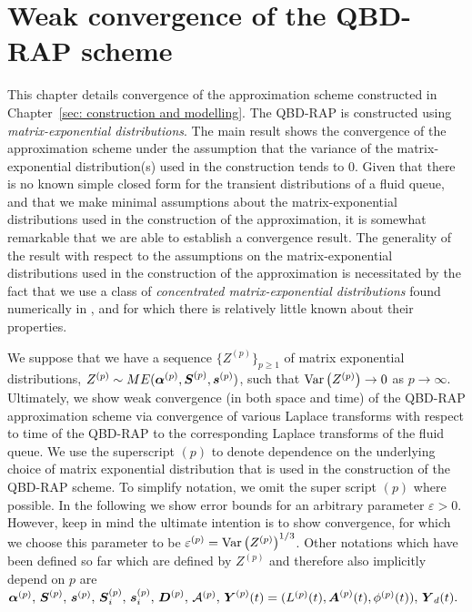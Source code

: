 \chapter{Weak convergence of the QBD-RAP scheme\label{sec: conv}}
This chapter details convergence of the approximation scheme constructed in Chapter~\ref{sec: construction and modelling}. The QBD-RAP is constructed using \emph{matrix-exponential distributions}. The main result shows the convergence of the approximation scheme under the assumption that the variance of the matrix-exponential distribution(s) used in the construction tends to 0. Given that there is no known simple closed form for the transient distributions of a fluid queue, and that we make minimal assumptions about the matrix-exponential distributions used in the construction of the approximation, it is somewhat remarkable that we are able to establish a convergence result. The generality of the result with respect to the assumptions on the matrix-exponential distributions used in the construction of the approximation is necessitated by the fact that we use a class of \emph{concentrated matrix-exponential distributions} found numerically in \citep{hht2020}, and for which there is relatively little known about their properties.

We suppose that we have a sequence \(\{Z^{(p)}\}_{p\geq 1}\) of matrix exponential distributions, \(Z^{(p)}\sim ME(\boldsymbol\alpha^{(p)},\boldsymbol S^{(p)}, \boldsymbol s^{(p)})\), such that \(\mathrm{Var}\left(Z^{(p)}\right)\to 0 \) as \(p\to \infty\). Ultimately, we show weak convergence (in both space and time) of the QBD-RAP approximation scheme via convergence of various Laplace transforms with respect to time of the QBD-RAP to the corresponding Laplace transforms of the fluid queue. We use the superscript \((p)\) to denote dependence on the underlying choice of matrix exponential distribution that is used in the construction of the QBD-RAP scheme. To simplify notation, we omit the super script \((p)\) where possible. In the following we show error bounds for an arbitrary parameter \(\varepsilon>0\). However, keep in mind the ultimate intention is to show convergence, for which we choose this parameter to be \(\varepsilon^{(p)}=\mathrm{Var}\left(Z^{(p)}\right)^{1/3}\). Other notations which have been defined so far which are defined by \(Z^{(p)}\) and therefore also implicitly depend on \(p\) are \(\boldsymbol\alpha^{(p)},\,\boldsymbol S^{(p)},\,\boldsymbol s^{(p)},\, \boldsymbol S_i^{(p)},\, \boldsymbol s_i^{(p)},\, \boldsymbol D^{(p)},\,\mathcal A^{(p)},\, \boldsymbol Y^{(p)}(t) = (L^{(p)}(t),\boldsymbol A^{(p)}(t), \phi^{(p)}(t)),\, \boldsymbol Y_d(t).\)

